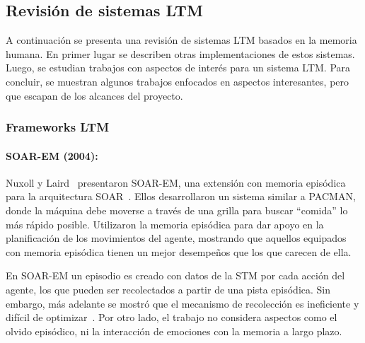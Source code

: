 \subsection{Revisión de sistemas LTM}\label{sec:revision_LTM}

A continuación se presenta una revisión de sistemas LTM basados en la memoria humana. En primer lugar se describen otras implementaciones de estos sistemas. Luego, se estudian trabajos con aspectos de interés para un sistema LTM. Para concluir, se muestran algunos trabajos enfocados en aspectos interesantes, pero que escapan de los alcances del proyecto.

\subsubsection{Frameworks LTM}

\paragraph{SOAR-EM (2004):} 
Nuxoll y Laird~\cite{Nuxoll2004ACM} presentaron SOAR-EM, una extensión con memoria episódica para la arquitectura SOAR~\cite{LAIRD19871}. Ellos desarrollaron un sistema similar a PACMAN, donde la máquina debe moverse a través de una grilla para buscar ``comida'' lo más rápido posible. Utilizaron la memoria episódica para dar apoyo en la planificación de los movimientos del agente, mostrando que aquellos equipados con memoria episódica tienen un mejor desempeños que los que carecen de ella. 

En SOAR-EM un episodio es creado con datos de la STM por cada acción del agente, los que pueden ser recolectados a partir de una pista episódica. Sin embargo, más adelante se mostró que el mecanismo de recolección es ineficiente y difícil de optimizar~\cite{Nuxoll2007}. Por otro lado, el trabajo no considera aspectos como el olvido episódico, ni la interacción de emociones con la memoria a largo plazo.


